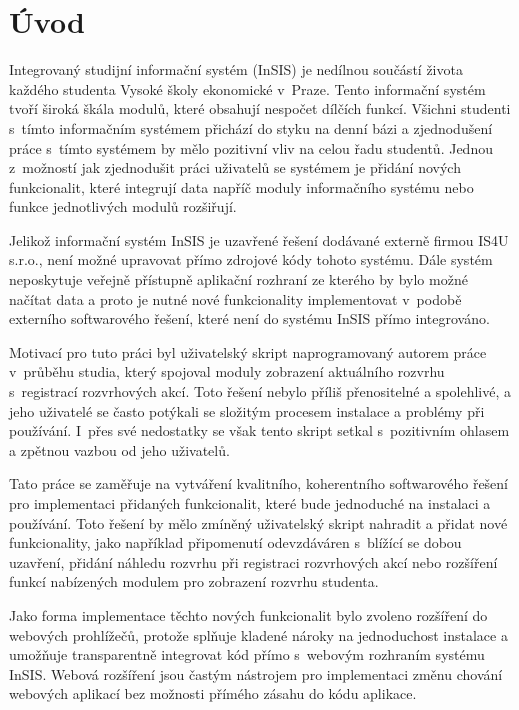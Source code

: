 \chapter*{Úvod}

Integrovaný studijní informační systém (InSIS) je nedílnou součástí života každého studenta Vysoké školy ekonomické v~Praze. Tento informační systém tvoří široká škála modulů, které obsahují nespočet dílčích funkcí. Všichni studenti s~tímto informačním systémem přichází do styku na denní bázi a zjednodušení práce s~tímto systémem by mělo pozitivní vliv na celou řadu studentů. Jednou z~možností jak zjednodušit práci uživatelů se systémem je přidání nových funkcionalit, které integrují data napříč moduly informačního systému nebo funkce jednotlivých modulů rozšiřují. 

Jelikož informační systém InSIS je uzavřené řešení dodávané externě firmou IS4U s.r.o., není možné upravovat přímo zdrojové kódy tohoto systému. Dále systém neposkytuje veřejně přístupně aplikační rozhraní ze kterého by bylo možné načítat data a proto je nutné nové funkcionality implementovat v~podobě externího softwarového řešení, které není do systému InSIS přímo integrováno. 

Motivací pro tuto práci byl uživatelský skript naprogramovaný autorem práce v~průběhu studia, který spojoval moduly zobrazení aktuálního rozvrhu s~registrací rozvrhových akcí. Toto řešení nebylo příliš přenositelné a spolehlivé, a jeho uživatelé se často potýkali se složitým procesem instalace a problémy při používání. I~přes své nedostatky se však tento skript setkal s~pozitivním ohlasem a zpětnou vazbou od jeho uživatelů.

Tato práce se zaměřuje na vytváření kvalitního, koherentního softwarového řešení pro implementaci přidaných funkcionalit, které bude jednoduché na instalaci a používání. Toto řešení by mělo zmíněný uživatelský skript nahradit a přidat nové funkcionality, jako například připomenutí odevzdáváren s~blížící se dobou uzavření, přidání náhledu rozvrhu při registraci rozvrhových akcí nebo rozšíření funkcí nabízených modulem pro zobrazení rozvrhu studenta. 

Jako forma implementace těchto nových funkcionalit bylo zvoleno rozšíření do webových prohlížečů, protože splňuje kladené nároky na jednoduchost instalace a umožňuje transparentně integrovat kód přímo s~webovým rozhraním systému InSIS. Webová rozšíření jsou častým nástrojem pro implementaci změnu chování webových aplikací bez možnosti přímého zásahu do kódu aplikace. 

